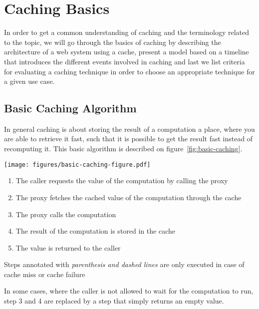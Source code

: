 \chapter{Caching Basics}
\label{chapter:caching-model}

In order to get a common understanding of caching and the terminology related to the topic, we will go through the basics of caching by describing the architecture of a web system using a cache, present a model based on a timeline that introduces the different events involved in caching and last we list criteria for evaluating a caching technique in order to choose an appropriate technique for a given use case.

\section{Basic Caching Algorithm}
\label{sec:caching_basics}

In general caching is about storing the result of a computation a place, where you are able to retrieve it fast, such that it is possible to get the result fast instead of recomputing it. This basic algorithm is described on figure~\ref{fig:basic-caching}.

\begin{figure*}[ht!]
  \begin{center}
    \texttt{[image: figures/basic-caching-figure.pdf]}
  \end{center}
  \begin{enumerate}
    \item The caller requests the value of the computation by calling the proxy
    \item The proxy fetches the cached value of the computation through the cache
    \item[(3)] The proxy calls the computation
    \item[(4)] The result of the computation is stored in the cache
    \item The value is returned to the caller
  \end{enumerate}
  \footnotesize{Steps annotated with \emph{parenthesis and dashed lines} are only executed in case of cache miss or cache failure}
  \caption{The flow of basic caching}
  \label{fig:basic-caching}
\end{figure*}

In some cases, where the caller is not allowed to wait for the computation to run, step 3 and 4 are replaced by a step that simply returns an empty value.

